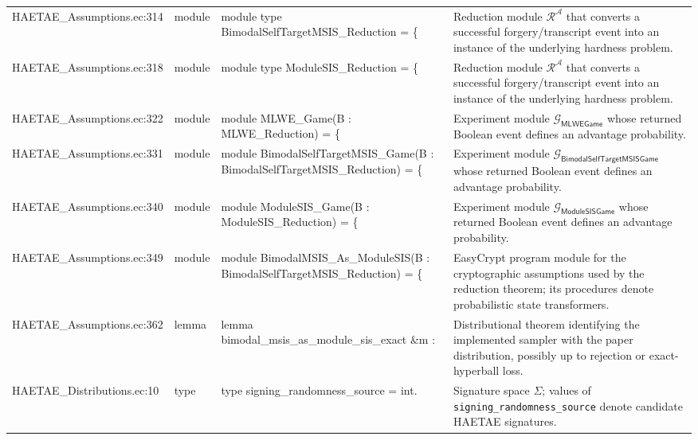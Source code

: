 \documentclass[10pt]{article}
\newcommand{\EC}[1]{\texttt{#1}}
\begin{document}
\begin{longtable}{L{0.11\textwidth}L{0.055\textwidth}L{0.385\textwidth}L{0.41\textwidth}}
HAETAE\_\allowbreak{}Assumptions.\allowbreak{}ec:\allowbreak{}314 & module & {\ttfamily\scriptsize module type BimodalSelfTargetMSIS\_\allowbreak{}Reduction = \{} & Reduction module $\mathcal R^\mathcal A$ that converts a successful forgery/transcript event into an instance of the underlying hardness problem. \\
HAETAE\_\allowbreak{}Assumptions.\allowbreak{}ec:\allowbreak{}318 & module & {\ttfamily\scriptsize module type ModuleSIS\_\allowbreak{}Reduction = \{} & Reduction module $\mathcal R^\mathcal A$ that converts a successful forgery/transcript event into an instance of the underlying hardness problem. \\
HAETAE\_\allowbreak{}Assumptions.\allowbreak{}ec:\allowbreak{}322 & module & {\ttfamily\scriptsize module MLWE\_\allowbreak{}Game(B : MLWE\_\allowbreak{}Reduction) = \{} & Experiment module $\mathcal G_{\mathsf{MLWEGame}}$ whose returned Boolean event defines an advantage probability. \\
HAETAE\_\allowbreak{}Assumptions.\allowbreak{}ec:\allowbreak{}331 & module & {\ttfamily\scriptsize module BimodalSelfTargetMSIS\_\allowbreak{}Game(B : BimodalSelfTargetMSIS\_\allowbreak{}Reduction) = \{} & Experiment module $\mathcal G_{\mathsf{BimodalSelfTargetMSISGame}}$ whose returned Boolean event defines an advantage probability. \\
HAETAE\_\allowbreak{}Assumptions.\allowbreak{}ec:\allowbreak{}340 & module & {\ttfamily\scriptsize module ModuleSIS\_\allowbreak{}Game(B : ModuleSIS\_\allowbreak{}Reduction) = \{} & Experiment module $\mathcal G_{\mathsf{ModuleSISGame}}$ whose returned Boolean event defines an advantage probability. \\
HAETAE\_\allowbreak{}Assumptions.\allowbreak{}ec:\allowbreak{}349 & module & {\ttfamily\scriptsize module BimodalMSIS\_\allowbreak{}As\_\allowbreak{}ModuleSIS(B : BimodalSelfTargetMSIS\_\allowbreak{}Reduction) = \{} & EasyCrypt program module for the cryptographic assumptions used by the reduction theorem; its procedures denote probabilistic state transformers. \\
HAETAE\_\allowbreak{}Assumptions.\allowbreak{}ec:\allowbreak{}362 & lemma & {\ttfamily\scriptsize lemma bimodal\_\allowbreak{}msis\_\allowbreak{}as\_\allowbreak{}module\_\allowbreak{}sis\_\allowbreak{}exact \&m :} & Distributional theorem identifying the implemented sampler with the paper distribution, possibly up to rejection or exact-hyperball loss. \\
HAETAE\_\allowbreak{}Distributions.\allowbreak{}ec:\allowbreak{}10 & type & {\ttfamily\scriptsize type signing\_\allowbreak{}randomness\_\allowbreak{}source = int.} & Signature space $\Sigma$; values of \EC{signing\_randomness\_source} denote candidate HAETAE signatures. \\

\end{longtable}
\end{document}

